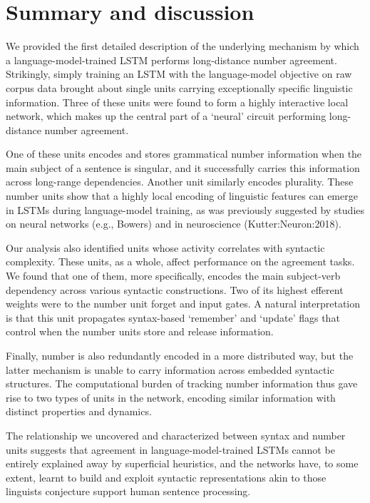 \section{Summary and discussion}
We provided the first  detailed description of the underlying mechanism by which a language-model-trained LSTM performs long-distance  number agreement. %
Strikingly, simply training an LSTM with the language-model objective on raw corpus data brought about single units carrying exceptionally specific linguistic information. Three of these units were found to form a highly interactive local network, which makes up the central part of a `neural' circuit performing long-distance number agreement.

One of these units encodes and stores grammatical number information when the main subject of a sentence is singular, and it successfully carries this information across long-range dependencies. Another unit similarly encodes plurality. These number units show that a highly local encoding of linguistic features can emerge in LSTMs during language-model training, as was previously suggested by studies on neural networks (e.g., Bowers) and in neuroscience (Kutter:Neuron:2018).

Our analysis also identified units whose activity correlates with syntactic complexity. These units, as a whole, affect performance on the agreement tasks. We found that one of them, more specifically, encodes the main subject-verb dependency across various syntactic constructions. Two of its highest efferent weights were to the number unit forget and input gates. A natural interpretation is that this unit propagates syntax-based `remember' and `update' flags that control when the number units store and release information. %

Finally, number is also redundantly encoded in a more distributed way, but the latter mechanism is unable to carry information across embedded syntactic structures. The computational burden of tracking number information thus gave rise to two types of units in the network,  encoding similar information  with distinct properties and dynamics.

The relationship we uncovered and characterized between syntax and number units suggests that agreement in language-model-trained LSTMs cannot be entirely explained away by superficial heuristics, and the networks have, to some extent, learnt to build and exploit syntactic representations akin to those linguists conjecture support human sentence processing.

